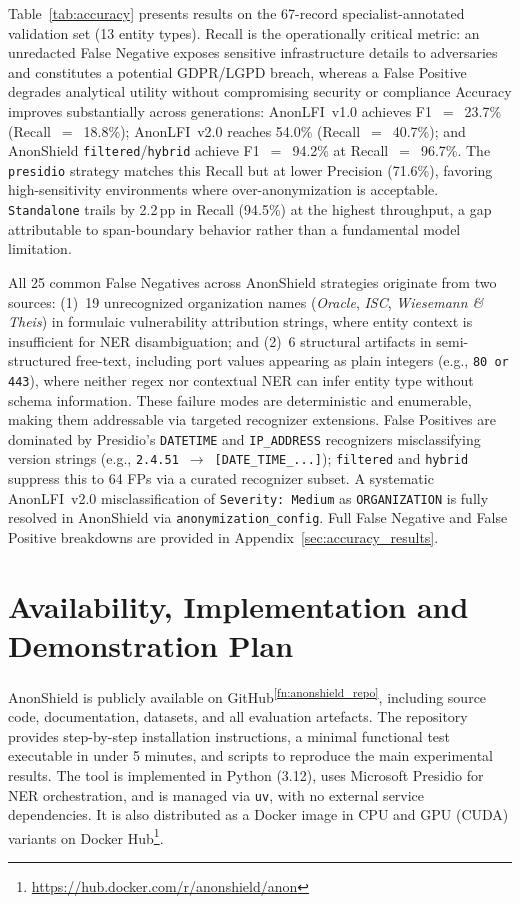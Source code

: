 \documentclass[12pt]{article}
\begin{document}
Table~\ref{tab:accuracy} presents results on the 67-record specialist-annotated
validation set (13 entity types). Recall is the operationally critical metric:
an unredacted False Negative exposes sensitive infrastructure details to adversaries and constitutes a potential GDPR/LGPD breach, whereas a False Positive degrades analytical utility without compromising security or compliance
Accuracy improves substantially across generations: AnonLFI~v1.0 achieves
F1~$=$~23.7\% (Recall~$=$~18.8\%); AnonLFI~v2.0 reaches 54.0\%
(Recall~$=$~40.7\%); and AnonShield \texttt{filtered}/\texttt{hybrid} achieve
F1~$=$~94.2\% at Recall~$=$~96.7\%. The \texttt{presidio} strategy matches this
Recall but at lower Precision (71.6\%), favoring high-sensitivity environments
where over-anonymization is acceptable. \texttt{Standalone} trails by 2.2\,pp
in Recall (94.5\%) at the highest throughput, a gap attributable to
span-boundary behavior rather than a fundamental model limitation.

All 25 common False Negatives across AnonShield strategies originate from two
sources: (1)~19 unrecognized organization names
(\textit{Oracle}, \textit{ISC}, \textit{Wiesemann \& Theis}) in formulaic
vulnerability attribution strings, where entity context is insufficient for
NER disambiguation; and (2)~6 structural artifacts in semi-structured
free-text, including port values appearing as plain integers
(e.g., \texttt{80 or 443}), where neither regex nor contextual NER can infer
entity type without schema information. These failure modes are deterministic
and enumerable, making them addressable via targeted recognizer extensions.
False Positives are dominated by Presidio's \texttt{DATETIME} and
\texttt{IP\_ADDRESS} recognizers misclassifying version strings
(e.g., \texttt{2.4.51}~$\to$~\texttt{[DATE\_TIME\_...]}); \texttt{filtered}
and \texttt{hybrid} suppress this to 64 FPs via a curated recognizer subset.
A systematic AnonLFI~v2.0 misclassification of \texttt{Severity:~Medium} as
\texttt{ORGANIZATION} is fully resolved in AnonShield via
\texttt{anonymization\_config}. Full False Negative and False Positive
breakdowns are provided in Appendix~\ref{sec:accuracy_results}.



\section{Availability, Implementation and Demonstration Plan}
\label{sec:availability}

AnonShield is publicly available on GitHub\textsuperscript{\ref{fn:anonshield_repo}}, including source code, documentation, datasets, and all evaluation artefacts. The repository provides step-by-step installation instructions, a minimal functional test executable in under 5 minutes, and scripts to reproduce the main experimental results. The tool is implemented in Python (3.12), uses Microsoft Presidio for NER orchestration, and is managed via \texttt{uv}, with no external service dependencies. It is also distributed as a Docker image in CPU and GPU (CUDA) variants on Docker Hub\footnote{\url{https://hub.docker.com/r/anonshield/anon}}.
\end{document}
